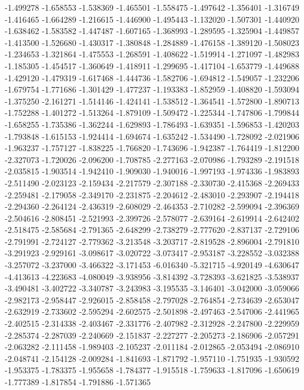-1.499278
-1.658553
-1.538369
-1.465501
-1.558475
-1.497642
-1.356401
-1.316749
-1.416465
-1.664289
-1.216615
-1.446900
-1.495443
-1.132020
-1.507301
-1.440920
-1.638462
-1.583582
-1.447487
-1.607165
-1.368993
-1.289595
-1.325904
-1.449857
-1.413500
-1.526680
-1.430317
-1.380848
-1.284889
-1.476158
-1.389120
-1.508023
-1.234653
-1.321864
-1.475553
-1.268591
-1.408622
-1.519914
-1.271097
-1.482983
-1.185305
-1.454517
-1.360649
-1.418911
-1.299695
-1.417104
-1.653779
-1.449688
-1.429120
-1.479319
-1.617468
-1.444736
-1.582706
-1.694812
-1.549057
-1.232206
-1.679754
-1.771686
-1.301429
-1.477237
-1.193383
-1.852959
-1.408820
-1.593094
-1.375250
-2.161271
-1.514146
-1.424141
-1.538512
-1.364541
-1.572800
-1.890713
-1.752288
-1.401272
-1.513264
-1.879109
-1.509472
-1.225344
-1.747806
-1.799844
-1.658255
-1.735386
-1.362244
-1.629893
-1.786493
-1.639351
-1.596853
-1.420203
-1.793848
-1.615153
-1.924414
-1.694674
-1.635242
-1.534490
-1.728092
-2.021906
-1.963237
-1.757127
-1.838225
-1.766820
-1.743696
-1.942387
-1.764419
-1.812200
-2.327073
-1.720026
-2.096200
-1.708785
-2.277163
-2.070986
-1.793289
-2.191518
-2.035815
-1.903514
-1.942410
-1.909030
-1.940016
-1.997193
-1.974336
-1.983893
-2.511490
-2.023123
-2.159434
-2.217579
-2.307188
-2.330730
-2.415368
-2.269433
-2.259481
-2.179058
-2.349170
-2.231875
-2.204612
-2.483010
-2.293907
-2.194418
-2.294360
-2.264124
-2.436319
-2.608029
-2.464353
-2.710282
-2.599094
-2.396369
-2.504616
-2.808451
-2.521993
-2.399726
-2.578077
-2.639164
-2.619914
-2.642402
-2.518475
-2.585684
-2.791365
-2.648299
-2.738279
-2.777620
-2.837137
-2.729106
-2.791991
-2.724127
-2.779362
-3.213548
-3.203717
-2.819528
-2.896004
-2.791810
-3.291923
-2.929161
-3.098617
-3.020722
-3.073417
-2.953187
-3.228552
-3.032388
-3.257072
-3.237000
-3.466322
-3.171453
-6.016340
-5.321715
-4.920149
-4.630647
-4.413613
-4.223683
-4.080049
-3.938956
-3.814392
-3.728393
-3.621825
-3.538937
-3.490481
-3.402722
-3.340787
-3.243983
-3.195535
-3.146401
-3.042000
-3.059066
-2.982173
-2.958447
-2.926015
-2.858458
-2.797028
-2.764854
-2.734639
-2.653047
-2.632919
-2.733602
-2.595294
-2.602575
-2.501898
-2.497463
-2.547006
-2.441965
-2.402515
-2.314338
-2.403467
-2.331776
-2.407982
-2.312928
-2.247800
-2.229959
-2.285374
-2.287039
-2.240669
-2.151837
-2.227277
-2.205273
-2.186906
-2.057291
-2.063282
-2.111458
-1.989403
-2.105237
-2.011184
-2.012865
-2.053494
-2.086910
-2.048741
-2.154128
-2.009284
-1.841693
-1.871792
-1.957110
-1.751935
-1.930592
-1.953375
-1.783375
-1.955658
-1.784377
-1.915518
-1.759633
-1.817096
-1.650619
-1.777389
-1.817854
-1.791886
-1.571365
